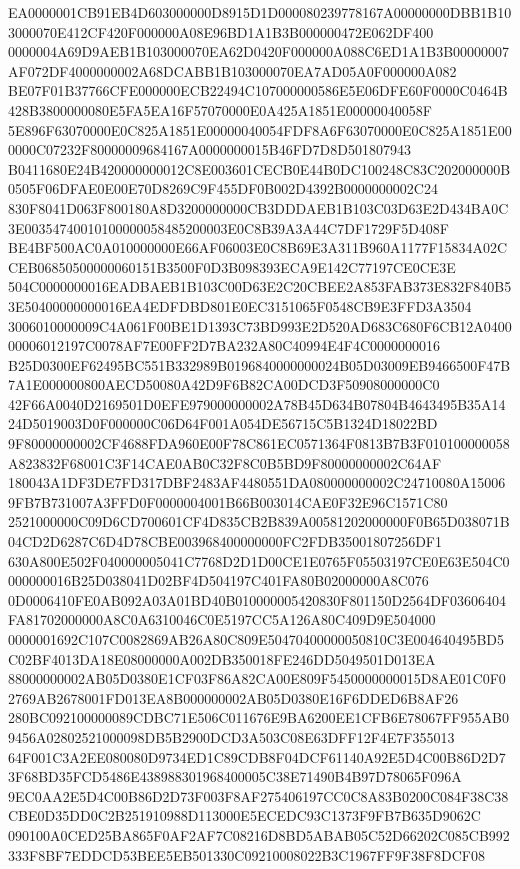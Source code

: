 \documentclass[UTF8,fontset=fandol,zihao=-4,a4paper]{ctexart}
\begin{document}
{{EA0000001CB91EB4D603000000D8915D1D000080239778167A00000000DBB1B103000070E412CF420F000000A08E96BD1A1B3B000000472E062DF400
0000004A69D9AEB1B103000070EA62D0420F000000A088C6ED1A1B3B00000007AF072DF4000000002A68DCABB1B103000070EA7AD05A0F000000A082
BE07F01B37766CFE000000ECB22494C107000000586E5E06DFE60F0000C0464B428B3800000080E5FA5EA16F57070000E0A425A1851E00000040058F
5E896F63070000E0C825A1851E00000040054FDF8A6F63070000E0C825A1851E000000C07232F80000009684167A0000000015B46FD7D8D501807943
B0411680E24B420000000012C8E003601CECB0E44B0DC100248C83C202000000B0505F06DFAE0E00E70D8269C9F455DF0B002D4392B0000000002C24
830F8041D063F800180A8D3200000000CB3DDDAEB1B103C03D63E2D434BA0C3E00354740010100000058485200003E0C8B39A3A44C7DF1729F5D408F
BE4BF500AC0A010000000E66AF06003E0C8B69E3A311B960A1177F15834A02CCEB06850500000060151B3500F0D3B098393ECA9E142C77197CE0CE3E
504C0000000016EADBAEB1B103C00D63E2C20CBEE2A853FAB373E832F840B53E50400000000016EA4EDFDBD801E0EC3151065F0548CB9E3FFD3A3504
3006010000009C4A061F00BE1D1393C73BD993E2D520AD683C680F6CB12A040000006012197C0078AF7E00FF2D7BA232A80C40994E4F4C0000000016
B25D0300EF62495BC551B332989B0196840000000024B05D03009EB9466500F47B7A1E000000800AECD50080A42D9F6B82CA00DCD3F50908000000C0
42F66A0040D2169501D0EFE979000000002A78B45D634B07804B4643495B35A1424D5019003D0F000000C06D64F001A054DE56715C5B1324D18022BD
9F80000000002CF4688FDA960E00F78C861EC0571364F0813B7B3F010100000058A823832F68001C3F14CAE0AB0C32F8C0B5BD9F80000000002C64AF
180043A1DF3DE7FD317DBF2483AF4480551DA080000000002C24710080A150069FB7B731007A3FFD0F0000004001B66B003014CAE0F32E96C1571C80
2521000000C09D6CD700601CF4D835CB2B839A00581202000000F0B65D038071B04CD2D6287C6D4D78CBE003968400000000FC2FDB35001807256DF1
630A800E502F040000005041C7768D2D1D00CE1E0765F05503197CE0E63E504C0000000016B25D038041D02BF4D504197C401FA80B02000000A8C076
0D0006410FE0AB092A03A01BD40B010000005420830F801150D2564DF03606404FA81702000000A8C0A6310046C0E5197CC5A126A80C409D9E504000
0000001692C107C0082869AB26A80C809E50470400000050810C3E004640495BD5C02BF4013DA18E08000000A002DB350018FE246DD5049501D013EA
88000000002AB05D0380E1CF03F86A82CA00E809F5450000000015D8AE01C0F02769AB2678001FD013EA8B000000002AB05D0380E16F6DDED6B8AF26
280BC092100000089CDBC71E506C011676E9BA6200EE1CFB6E78067FF955AB09456A02802521000098DB5B2900DCD3A503C08E63DFF12F4E7F355013
64F001C3A2EE080080D9734ED1C89CDB8F04DCF61140A92E5D4C00B86D2D73F68BD35FCD5486E438988301968400005C38E71490B4B97D78065F096A
9EC0AA2E5D4C00B86D2D73F003F8AF275406197CC0C8A83B0200C084F38C38CBE0D35DD0C2B251910988D113000E5ECEDC93C1373F9FB7B635D9062C
090100A0CED25BA865F0AF2AF7C08216D8BD5ABAB05C52D66202C085CB992333F8BF7EDDCD53BEE5EB501330C09210008022B3C1967FF9F38F8DCF08
}}
\end{document}
